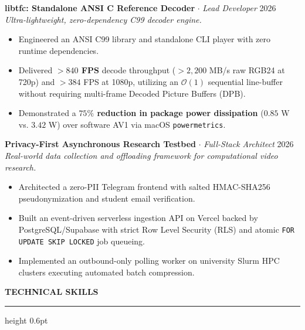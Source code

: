 \documentclass[11pt,letterpaper]{article}
\newcommand{\cvsection}[1]{%
  \vspace{10pt}%
  {\noindent\large\bfseries\MakeUppercase{#1}}\\[-2pt]%
  \hrule height 0.6pt%
  \vspace{5pt}%
}
\begin{document}
\vspace{3pt}

\textbf{libtfc: Standalone ANSI C Reference Decoder} $\cdot$ \textit{Lead Developer} \hfill 2026 \\
\textit{Ultra-lightweight, zero-dependency C99 decoder engine.}
\begin{itemize}
    \setlength{\itemsep}{1pt}
    \setlength{\parskip}{0pt}
    \setlength{\parsep}{0pt}
    \item Engineered an ANSI C99 library and standalone CLI player with zero runtime dependencies.
    \item Delivered \textbf{$>840$ FPS} decode throughput ($>2{,}200$ MB/s raw RGB24 at 720p) and $>384$ FPS at 1080p, utilizing an $\mathcal{O}(1)$ sequential line-buffer without requiring multi-frame Decoded Picture Buffers (DPB).
    \item Demonstrated a \textbf{$75\%$ reduction in package power dissipation} ($0.85$ W vs. $3.42$ W) over software AV1 via macOS \texttt{powermetrics}.
\end{itemize}

\vspace{3pt}

\textbf{Privacy-First Asynchronous Research Testbed} $\cdot$ \textit{Full-Stack Architect} \hfill 2026 \\
\textit{Real-world data collection and offloading framework for computational video research.}
\begin{itemize}
    \setlength{\itemsep}{1pt}
    \setlength{\parskip}{0pt}
    \setlength{\parsep}{0pt}
    \item Architected a zero-PII Telegram frontend with salted HMAC-SHA256 pseudonymization and student email verification.
    \item Built an event-driven serverless ingestion API on Vercel backed by PostgreSQL/Supabase with strict Row Level Security (RLS) and atomic \texttt{FOR UPDATE SKIP LOCKED} job queueing.
    \item Implemented an outbound-only polling worker on university Slurm HPC clusters executing automated batch compression.
\end{itemize}

\cvsection{Technical Skills}
\end{document}

